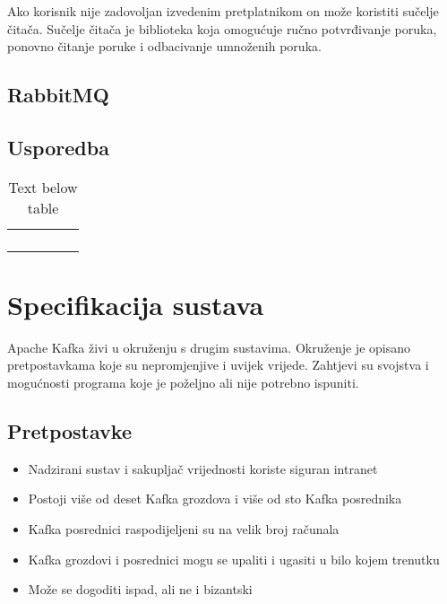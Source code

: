 \documentclass[times, utf8, diplomski, numeric]{fer}
\begin{document}
Ako korisnik nije zadovoljan izvedenim pretplatnikom on može koristiti sučelje čitača. Sučelje čitača je biblioteka koja omogućuje ručno potvrđivanje poruka, ponovno čitanje poruke i odbacivanje umnoženih poruka.

\section{RabbitMQ}

\section{Usporedba}

\begin{table}[]
\begin{tabular}{lllll}
 &  &  &  &  \\
 &  &  &  &  \\
 &  &  &  &  \\
 &  &  &  & 
\end{tabular}

\caption{Text below table}
\label{table:sample_table_label}

\end{table}

\chapter{Specifikacija sustava}

Apache Kafka živi u okruženju s drugim sustavima. Okruženje je opisano pretpostavkama koje su nepromjenjive i uvijek vrijede. Zahtjevi su svojstva i mogućnosti programa koje je poželjno ali nije potrebno ispuniti.

\section{Pretpostavke}

\begin{itemize}
    \item Nadzirani sustav i sakupljač vrijednosti koriste siguran intranet
    \item Postoji više od deset Kafka grozdova i više od sto Kafka posrednika
    \item Kafka posrednici raspodijeljeni su na velik broj računala
    \item Kafka grozdovi i posrednici mogu se upaliti i ugasiti u bilo kojem trenutku
    \item Može se dogoditi ispad, ali ne i bizantski
\end{itemize}
\end{document}

